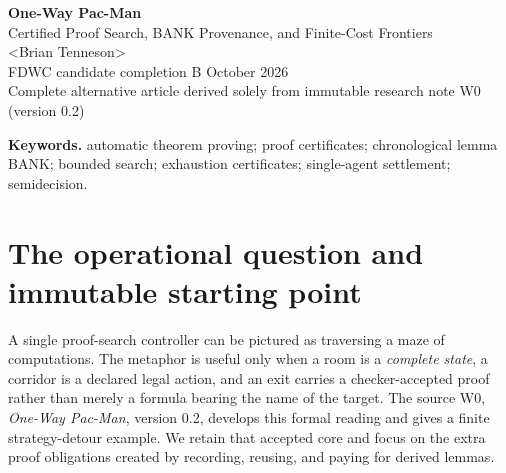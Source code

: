\documentclass[11pt,letterpaper]{article}
\theoremstyle{definition}
\theoremstyle{remark}
\newcommand{\paperdate}{26 October 2026}
\newcommand{\AuthorTag}{\textless{}Brian Tenneson\textgreater{}}
\begin{document}
\begin{center}
 {\LARGE\bfseries\color{deepblue} One-Way Pac-Man}\\[4pt]
 {\Large Certified Proof Search, BANK Provenance, and Finite-Cost Frontiers}\\[10pt]
 {\large \AuthorTag}\\[5pt]
 {\small FDWC candidate completion B \quad\textbullet\quad \paperdate}\\[4pt]
 {\small Complete alternative article derived solely from immutable research note W0 (version 0.2)}
\end{center}
\vspace{5pt}
\begin{abstract}
A one-Pioneer automatic theorem prover searches for one kind of terminal outcome: a checker-accepted derivation of a target formula. Modeling the prover by a fixed graph of complete states makes proof settlement, cost accounting, and source-provenance requirements explicit. This article reconstructs the one-role reduction, conservative BANK invariance, Bellman optimality, the original finite tactic-detour witness, exact regret, and conditional proof-enumeration completeness. It then strengthens the operational side in three ways. First, a chronological BANK ledger supports a finite certificate-expansion construction that removes references to conservatively deposited intermediate premises. Second, a finite countermodel shows why a shorter explicit-premise proof need not improve the full-state settlement horizon after a deposit. Third, an exhaustive, effectively generated finite-cost frontier yields a valid lower bound on settlement distance under local finiteness and complete successor generation; combined with a successful route, this can sometimes determine the exact horizon. These are abstract, assumption-dependent mathematical results. They do not provide an online optimal policy, proof of performance improvement, independent machine verification, or a negative verdict from a timeout.
\end{abstract}
\noindent\textbf{Keywords.} automatic theorem proving; proof certificates; chronological lemma BANK; bounded search; exhaustion certificates; single-agent settlement; semidecision.\par

\section{The operational question and immutable starting point}
A single proof-search controller can be pictured as traversing a maze of computations. The metaphor is useful only when a room is a \emph{complete state}, a corridor is a declared legal action, and an exit carries a checker-accepted proof rather than merely a formula bearing the name of the target. The source W0, \emph{One-Way Pac-Man}, version 0.2, develops this formal reading and gives a finite strategy-detour example. We retain that accepted core and focus on the extra proof obligations created by recording, reusing, and paying for derived lemmas.
\end{document}
